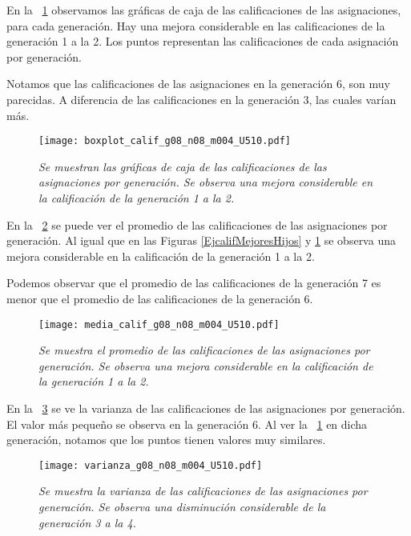 En la \figurename{~\ref{boxplot_calif_x_generacion}} observamos las gráficas de caja de las calificaciones de las asignaciones, para cada generación. Hay una mejora considerable en las calificaciones de la generación 1 a la 2. Los puntos representan las calificaciones de cada asignación por generación.

Notamos que las calificaciones de las asignaciones en la generación 6, son muy parecidas. A diferencia de las calificaciones en la generación 3, las cuales varían más.

\begin{figure}[H]
\centering
\texttt{[image: boxplot\_calif\_g08\_n08\_m004\_U510.pdf]} %
\caption[\textit{Gráficas de caja de calificaciones de asignaciones por generación}]{\textit{Se muestran las gráficas de caja de las calificaciones de las asignaciones por generación. Se observa una mejora considerable en la calificación de la generación 1 a la 2.}}\label{boxplot_calif_x_generacion}
\end{figure}

En la \figurename{~\ref{media_calif_x_generacion}} se puede ver el promedio de las calificaciones de las asignaciones por generación. Al igual que en las Figuras \ref{EjcalifMejoresHijos} y \ref{boxplot_calif_x_generacion} se observa una mejora considerable en la calificación de la generación 1 a la 2.

Podemos observar que el promedio de las calificaciones de la generación 7 es menor que el promedio de las calificaciones de la generación 6.

\begin{figure}[h]
\centering
\texttt{[image: media\_calif\_g08\_n08\_m004\_U510.pdf]} %
\caption[\textit{Media de calificaciones de asignaciones por generación}]{\textit{Se muestra el promedio de las calificaciones de las asignaciones por generación. Se observa una mejora considerable en la calificación de la generación 1 a la 2.}}\label{media_calif_x_generacion}
\end{figure}

En la \figurename{~\ref{var_calif_x_generacion}} se ve la varianza de las calificaciones de las asignaciones por generación. El valor más pequeño se observa en la generación 6. Al ver la \figurename{~\ref{boxplot_calif_x_generacion}} en dicha generación, notamos que los puntos tienen valores muy similares.

\begin{figure}[H]
\centering
\texttt{[image: varianza\_g08\_n08\_m004\_U510.pdf]} %
\caption[\textit{Varianza de calificaciones de asignaciones por generación}]{\textit{Se muestra la varianza de las calificaciones de las asignaciones por generación. Se observa una disminución considerable de la generación 3 a la 4.}}\label{var_calif_x_generacion}
\end{figure}

